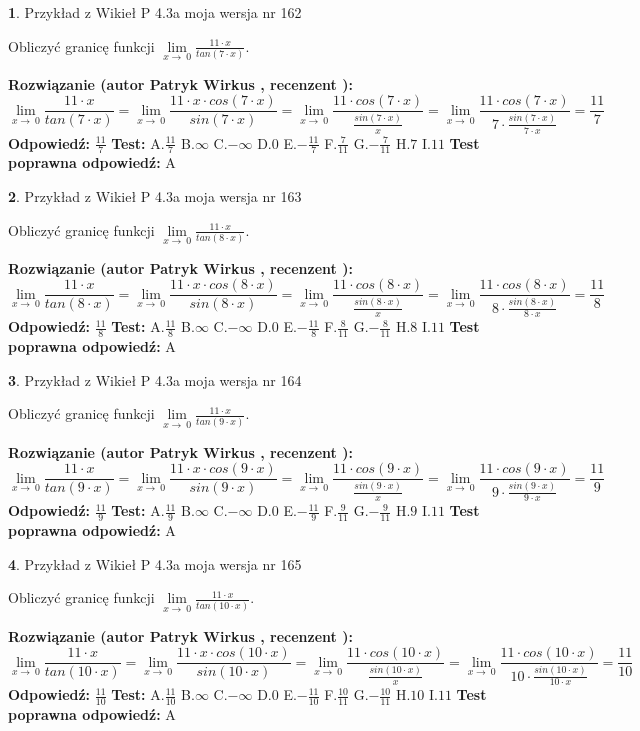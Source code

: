 \documentclass[12pt, a4paper]{article}
\theoremstyle{definition} %
\newtheorem{zad}{}
\newcommand{\zadStart}[1]{\begin{zad}#1\newline}
\newcommand{\zadStop}{\end{zad}}
\newcommand{\rozwStart}[2]{\noindent \textbf{Rozwiązanie (autor #1 , recenzent #2): }\newline}
\newcommand{\rozwStop}{\newline}
\newcommand{\odpStart}{\noindent \textbf{Odpowiedź:}\newline}
\newcommand{\odpStop}{\newline}
\newcommand{\testStart}{\noindent \textbf{Test:}\newline}
\newcommand{\testStop}{\newline}
\newcommand{\kluczStart}{\noindent \textbf{Test poprawna odpowiedź:}\newline}
\newcommand{\kluczStop}{\newline}
\begin{document}
\zadStart{Przykład z Wikieł P 4.3a moja wersja nr 162}


Obliczyć granicę funkcji $\lim\limits_{x\to\ 0}\frac{11 \cdot x}{tan(7 \cdot x)}$.
\zadStop
\rozwStart{Patryk Wirkus}{}
$$\lim\limits_{x\to\ 0}\frac{11 \cdot x}{tan(7 \cdot x)}=\lim\limits_{x\to\ 0}\frac{11 \cdot x \cdot cos(7 \cdot x)}{sin(7 \cdot x)}=\lim\limits_{x\to\ 0}\frac{11 \cdot cos(7 \cdot x)}{\frac{sin(7 \cdot x)}{x}}=\lim\limits_{x\to\ 0}\frac{11 \cdot cos(7 \cdot x)}{7 \cdot \frac{sin(7 \cdot x)}{7 \cdot x}} = \frac{11}{7}$$
\rozwStop
\odpStart
$\frac{11}{7}$
\odpStop
\testStart
A.$\frac{11}{7}$
B.$\infty$
C.$-\infty$
D.$0$
E.$-\frac{11}{7}$
F.$\frac{7}{11}$
G.$-\frac{7}{11}$
H.$7$
I.$11$
\testStop
\kluczStart
A
\kluczStop



\zadStart{Przykład z Wikieł P 4.3a moja wersja nr 163}


Obliczyć granicę funkcji $\lim\limits_{x\to\ 0}\frac{11 \cdot x}{tan(8 \cdot x)}$.
\zadStop
\rozwStart{Patryk Wirkus}{}
$$\lim\limits_{x\to\ 0}\frac{11 \cdot x}{tan(8 \cdot x)}=\lim\limits_{x\to\ 0}\frac{11 \cdot x \cdot cos(8 \cdot x)}{sin(8 \cdot x)}=\lim\limits_{x\to\ 0}\frac{11 \cdot cos(8 \cdot x)}{\frac{sin(8 \cdot x)}{x}}=\lim\limits_{x\to\ 0}\frac{11 \cdot cos(8 \cdot x)}{8 \cdot \frac{sin(8 \cdot x)}{8 \cdot x}} = \frac{11}{8}$$
\rozwStop
\odpStart
$\frac{11}{8}$
\odpStop
\testStart
A.$\frac{11}{8}$
B.$\infty$
C.$-\infty$
D.$0$
E.$-\frac{11}{8}$
F.$\frac{8}{11}$
G.$-\frac{8}{11}$
H.$8$
I.$11$
\testStop
\kluczStart
A
\kluczStop



\zadStart{Przykład z Wikieł P 4.3a moja wersja nr 164}


Obliczyć granicę funkcji $\lim\limits_{x\to\ 0}\frac{11 \cdot x}{tan(9 \cdot x)}$.
\zadStop
\rozwStart{Patryk Wirkus}{}
$$\lim\limits_{x\to\ 0}\frac{11 \cdot x}{tan(9 \cdot x)}=\lim\limits_{x\to\ 0}\frac{11 \cdot x \cdot cos(9 \cdot x)}{sin(9 \cdot x)}=\lim\limits_{x\to\ 0}\frac{11 \cdot cos(9 \cdot x)}{\frac{sin(9 \cdot x)}{x}}=\lim\limits_{x\to\ 0}\frac{11 \cdot cos(9 \cdot x)}{9 \cdot \frac{sin(9 \cdot x)}{9 \cdot x}} = \frac{11}{9}$$
\rozwStop
\odpStart
$\frac{11}{9}$
\odpStop
\testStart
A.$\frac{11}{9}$
B.$\infty$
C.$-\infty$
D.$0$
E.$-\frac{11}{9}$
F.$\frac{9}{11}$
G.$-\frac{9}{11}$
H.$9$
I.$11$
\testStop
\kluczStart
A
\kluczStop



\zadStart{Przykład z Wikieł P 4.3a moja wersja nr 165}


Obliczyć granicę funkcji $\lim\limits_{x\to\ 0}\frac{11 \cdot x}{tan(10 \cdot x)}$.
\zadStop
\rozwStart{Patryk Wirkus}{}
$$\lim\limits_{x\to\ 0}\frac{11 \cdot x}{tan(10 \cdot x)}=\lim\limits_{x\to\ 0}\frac{11 \cdot x \cdot cos(10 \cdot x)}{sin(10 \cdot x)}=\lim\limits_{x\to\ 0}\frac{11 \cdot cos(10 \cdot x)}{\frac{sin(10 \cdot x)}{x}}=\lim\limits_{x\to\ 0}\frac{11 \cdot cos(10 \cdot x)}{10 \cdot \frac{sin(10 \cdot x)}{10 \cdot x}} = \frac{11}{10}$$
\rozwStop
\odpStart
$\frac{11}{10}$
\odpStop
\testStart
A.$\frac{11}{10}$
B.$\infty$
C.$-\infty$
D.$0$
E.$-\frac{11}{10}$
F.$\frac{10}{11}$
G.$-\frac{10}{11}$
H.$10$
I.$11$
\testStop
\kluczStart
A
\kluczStop
\end{document}
